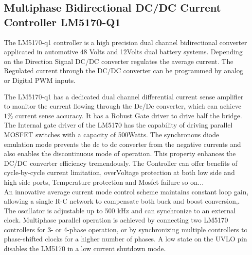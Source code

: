 \subsection{Multiphase Bidirectional DC/DC Current Controller LM5170-Q1}
\indent The LM5170-q1\cite{TI_LM5170_User_Datasheet} controller is a high precision dual channel bidirectional converter applicated in automotive 48 Volts and 12Volts dual battery systems.
Depending on the Direction Signal DC/DC converter regulates the average current. 
The Regulated current through the DC/DC converter can be programmed by analog or Digital PWM inputs.

The LM5170-q1\cite{TI_LM5170_User_Datasheet} has a dedicated dual channel differential current sense amplifier to monitor the current flowing through the Dc/Dc converter, which can achieve $1\%$ current sense accuracy.
It has a Robust Gate driver to drive half the bridge. The Internal gate driver of the LM5170 has the capability of driving parallel MOSFET switches with a capacity of 500Watts. 
The synchronous diode emulation mode prevents the dc to dc converter from the negative currents and also enables the discontinuous mode of operation. This property enhances the DC/DC converter efficiency tremendously. The Controller can offer benefits of cycle-by-cycle current limitation, overVoltage protection at both low side and high side ports, Temperature protection and Mosfet failure so on...
\\
\indent An innovative average current mode control scheme maintains constant loop gain, allowing a single R-C network
to compensate both buck and boost conversion\cite[p .2]{TI_LM5170_User_Datasheet},\cite{TI_LM5170_EVM_User_Guide}. The oscillator is adjustable up to 500 kHz and can synchronize
to an external clock. Multiphase parallel operation is achieved by connecting two LM5170 controllers for 3-
or 4-phase operation, or by synchronizing multiple controllers to phase-shifted clocks for a higher number of
phases. A low state on the UVLO pin disables the LM5170 in a low current shutdown mode\cite{TI_LM5170_User_Datasheet}.

